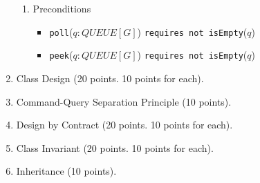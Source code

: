 \documentclass{report}
\begin{document}
\begin{enumerate}
\begin{enumerate}
		\item Preconditions		
		\begin{itemize}
			\item \texttt{poll}($q: QUEUE[G]$) \texttt{requires not isEmpty}($q$)
            \item \texttt{peek}($q: QUEUE[G]$) \texttt{requires not isEmpty}($q$)
		\end{itemize}
	\end{enumerate}

	\item Class Design (20 points. 10 points for each).

	\item Command-Query Separation Principle (10 points).
	
	\item Design by Contract  (20 points. 10 points for each).
	
	\item Class Invariant  (20 points. 10 points for each).
	
    \item Inheritance (10 points).

\end{enumerate}
\end{document}
